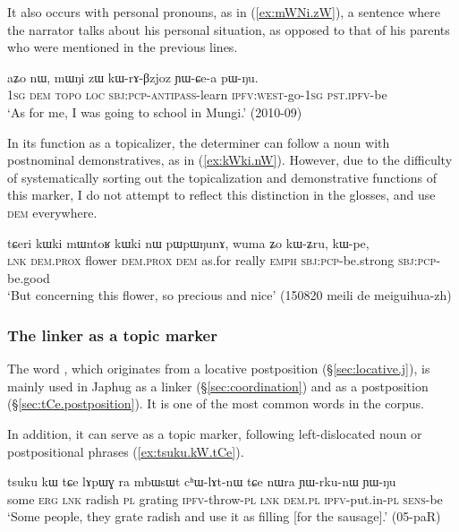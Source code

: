 It also occurs with personal pronouns, as in (\ref{ex:mWNi.zW}), a sentence where the narrator talks about his personal situation, as opposed to that of his parents who were mentioned in the previous lines.

\begin{exe}
\ex \label{ex:mWNi.zW}
\gll aʑo nɯ, mɯŋi zɯ kɯ-rɤ-βzjoz ɲɯ-ɕe-a pɯ-ŋu. \\
\textsc{1sg} \textsc{dem}  \textsc{topo} \textsc{loc} \textsc{sbj}:\textsc{pcp}-\textsc{antipass}-learn \textsc{ipfv}:\textsc{west}-go-\textsc{1sg} \textsc{pst}.\textsc{ipfv}-be \\
\glt `As for me, I was going to school in Mungi.' (2010-09)
\end{exe}

In its function as a topicalizer, the determiner  can follow a noun with postnominal demonstratives, as in (\ref{ex:kWki.nW}). However, due to the difficulty of systematically sorting out the topicalization and demonstrative functions of this marker, I do not attempt to reflect this distinction in the glosses, and use  \textsc{dem} everywhere.

\begin{exe}
\ex \label{ex:kWki.nW}
\gll tɕeri kɯki mɯntoʁ kɯki nɯ pɯpɯŋunɤ, wuma ʑo kɯ-ʑru, kɯ-pe, \\
\textsc{lnk} \textsc{dem}.\textsc{prox} flower \textsc{dem}.\textsc{prox} \textsc{dem} as.for really \textsc{emph} \textsc{sbj}:\textsc{pcp}-be.strong \textsc{sbj}:\textsc{pcp}-be.good \\ 
\glt `But concerning this flower, so precious and nice' (150820 meili de meiguihua-zh) 
\end{exe}

\subsubsection{The linker  as a topic marker} \label{sec:tCe.topic}
The word , which originates from a locative postposition (§\ref{sec:locative.j}), is mainly used in Japhug as a linker (§\ref{sec:coordination}) and as a postposition (§\ref{sec:tCe.postposition}). It is one of the most common words in the corpus.

In addition, it can serve as a topic marker, following left-dislocated noun or postpositional phrases (\ref{ex:tsuku.kW.tCe}).

\begin{exe}
\ex \label{ex:tsuku.kW.tCe}
\gll tsuku kɯ tɕe lɤpɯɣ ra mbɯsɯt cʰɯ-lɤt-nɯ tɕe nɯra ɲɯ-rku-nɯ ɲɯ-ŋu \\
some \textsc{erg} \textsc{lnk} radish \textsc{pl} grating \textsc{ipfv}-throw-\textsc{pl} \textsc{lnk} \textsc{dem}.\textsc{pl} \textsc{ipfv}-put.in-\textsc{pl} \textsc{sens}-be \\
\glt `Some people, they grate radish and use it as filling [for the sausage].' (05-paR) 
\end{exe}

